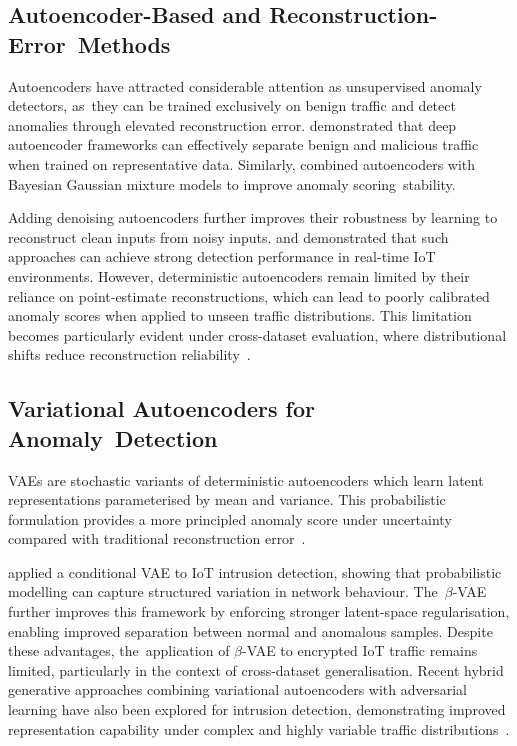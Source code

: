 \documentclass[futureinternet,article,accept,moreauthors]{Definitions/mdpi}
\begin{document}
\subsection{Autoencoder-Based and Reconstruction-Error~Methods}

Autoencoders have attracted considerable attention as unsupervised anomaly detectors, as~they can be trained exclusively on benign traffic and detect anomalies through elevated reconstruction error. \citet{alaghbari2023} demonstrated that deep autoencoder frameworks can effectively separate benign and malicious traffic when trained on representative data. Similarly, \citet{hou2022} combined autoencoders with Bayesian Gaussian mixture models to improve anomaly scoring~stability.

Adding denoising autoencoders further improves their robustness by learning to reconstruct clean inputs from noisy inputs. \citet{ayad2025} and \citet{berraadi2025} demonstrated that such approaches can achieve strong detection performance in real-time IoT environments. However, deterministic autoencoders remain limited by their reliance on point-estimate reconstructions, which can lead to poorly calibrated anomaly scores when applied to unseen traffic distributions. This limitation becomes particularly evident under cross-dataset evaluation, where distributional shifts reduce reconstruction reliability~\cite{cantone2024}.

\subsection{Variational Autoencoders for Anomaly~Detection}

VAEs are stochastic variants of deterministic autoencoders which learn latent 
representations parameterised by mean and variance. This probabilistic formulation 
provides a more principled anomaly score under uncertainty 
compared with traditional reconstruction error~\cite{lopez2017}.

\citet{lopez2017} applied a conditional VAE to IoT intrusion detection, showing that probabilistic modelling can capture structured variation in network behaviour. The~$\beta$-VAE further improves this framework by enforcing stronger latent-space regularisation, enabling improved separation between normal and anomalous samples. Despite these advantages, the~application of $\beta$-VAE to encrypted IoT traffic remains limited, particularly in the context of cross-dataset generalisation.
Recent hybrid generative approaches combining variational autoencoders with adversarial learning have also been explored for intrusion detection, demonstrating improved representation capability under complex and highly variable traffic distributions~\cite{wang2024}.
\end{document}
